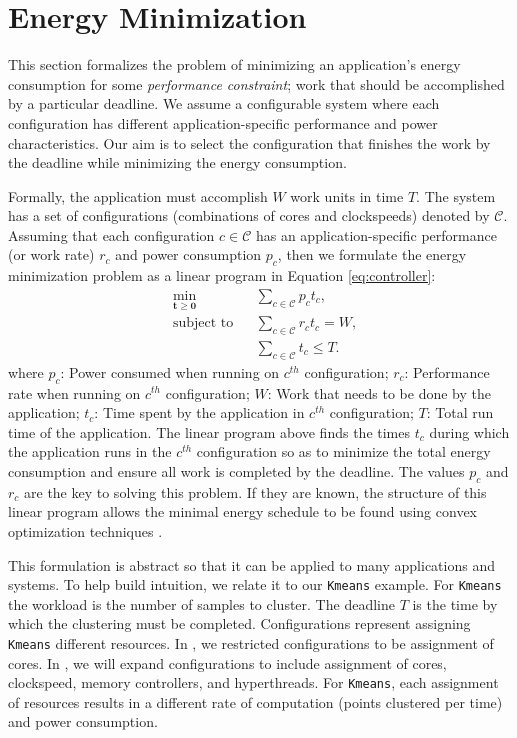 \section{Energy Minimization}
\label{sec:problemFormulation}

This section formalizes the problem of minimizing an application's
energy consumption for some \emph{performance constraint}; \ie work
that should be accomplished by a particular deadline.  We assume a
configurable system where each configuration has different
application-specific performance and power characteristics. Our aim is
to select the configuration that finishes the work by the deadline
while minimizing the energy consumption.

Formally, the application must accomplish $W$ work units in time $T$.
The system has a set of configurations (\eg combinations of cores and
clockspeeds) denoted by $\mathcal{C}$. Assuming that each
configuration $c \in \mathcal{C}$ has an application-specific
performance (or work rate) $r_c$ and power consumption $p_c$, then we
formulate the energy minimization problem as a linear program in
Equation \eqref{eq:controller}:
\begin{equation}
\begin{aligned}
&   \underset{\mathbf{t} \geq \mathbf{0}}{\text{min}}  
&&   \sum_{c \in \mathcal{C}} p_c t_c, \\
&   \text{subject to} &&  \sum_{c \in \mathcal{C}} r_c t_c = W, \\
&&&	 \sum_{c \in \mathcal{C}} t_c \leq T.
\end{aligned}
\label{eq:controller}
\end{equation}
where $p_c$: Power consumed when running on $c^{th}$ configuration;
$r_c$: Performance rate when running on $c^{th}$ configuration; $W$:
Work that needs to be done by the application; $t_c$: Time spent by
the application in $c^{th}$ configuration; $T$: Total run time of the
application. The linear program above finds the times $t_c$ during
which the application runs in the $c^{th}$ configuration so as to
minimize the total energy consumption and ensure all work is completed
by the deadline.  The values $p_c$ and $r_c$ are the key to solving
this problem.  If they are known, the structure of this linear program
allows the minimal energy schedule to be found using convex
optimization techniques \cite{LinearProgramming}. 

This formulation is abstract so that it can be applied to many
applications and systems.  To help build intuition, we relate it to
our \texttt{Kmeans} example.  For \texttt{Kmeans} the workload is the
number of samples to cluster.  The deadline $T$ is the time by which
the clustering must be completed.  Configurations represent assigning
\texttt{Kmeans} different resources.  In , we
restricted configurations to be assignment of cores.  In
, we will expand configurations to include
assignment of cores, clockspeed, memory controllers, and hyperthreads.
For \texttt{Kmeans}, each assignment of resources results in a
different rate of computation (points clustered per time) and power
consumption.  


